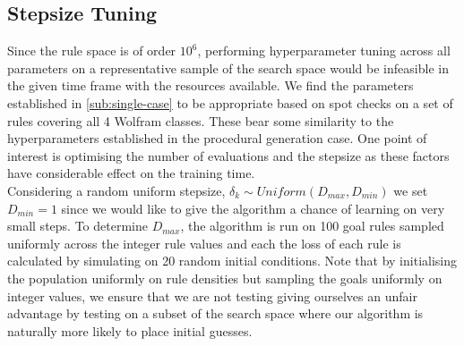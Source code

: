 \subsection{Stepsize Tuning}\label{sub:hyperparameter-tuning}
 
Since the rule space is of order $10^6$, performing hyperparameter tuning across all parameters on a representative sample of the search space would be infeasible in the given time frame with the resources available. We find the parameters established in \ref{sub:single-case} to be appropriate based on spot checks on a set of rules covering all 4 Wolfram classes. These bear some similarity to the hyperparameters established in the procedural generation case. One point of interest is optimising the number of evaluations and the stepsize as these factors have considerable effect on the training time.\\

Considering a random uniform stepsize, $\delta_k \sim \mathit{Uniform}(D_{max}, D_{min})$ we set $D_{min} = 1$ since we would like to give the algorithm a chance of learning on very small steps. To determine $D_{max}$, the algorithm is run on 100 goal rules sampled uniformly across the integer rule values and each the loss of each rule is calculated by simulating on 20 random initial conditions. Note that by initialising the population uniformly on rule densities but sampling the goals uniformly on integer values, we ensure that we are not testing giving ourselves an unfair advantage by testing on a subset of the search space where our algorithm is naturally more likely to place initial guesses.\\

\begin{table}
    \centering\hfill
    \hfill
    \hfill
\end{table}

